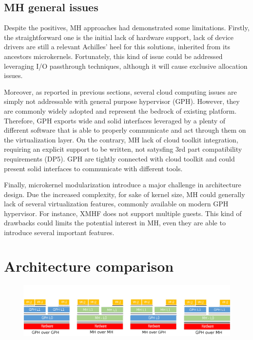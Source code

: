 \documentclass{sig-alternate}
\begin{document}
\subsection {MH general issues}

Despite the positives, MH approaches had demonstrated some limitations. Firstly, the straightforward one is the initial lack of hardware support, lack of device drivers are still a relevant Achilles' heel for this solutions, inherited from its ancestors microkernels. Fortunately, this kind of issue could be addressed leveraging I/O passthrough techniques, although it will cause exclusive allocation issues.

Moreover, as reported in previous sections, several cloud computing issues are simply not addressable with general purpose hypervisor (GPH). However, they are commonly widely adopted and represent the bedrock of existing platform. Therefore, GPH exports wide and solid interfaces leveraged by a plenty of different software that is able to properly communicate and act through them on the virtualization layer. On the contrary, MH lack of cloud toolkit integration, requiring an explicit support to be written, not satysfing 3rd part compatibility requirements (DP5). GPH are tightly connected with cloud toolkit and could present solid interfaces to communicate with different tools. 

Finally, microkernel modularization introduce a major challenge in architecture design. Due the increased complexity, for sake of kernel size, MH could generally lack of several virtualization features, commonly available on modern GPH hypervisor. For instance, XMHF does not support multiple guests. This kind of drawbacks could limits the potential interest in MH, even they are able to introduce several important features.

\section{Architecture comparison}
\label{sec:archcomp}

\begin{figure}
\begin{center}
\includegraphics[width=2\columnwidth]{globalcut.png}
\end{center}
\caption{}
\label{fig:io}
\end{figure}
\end{document}
